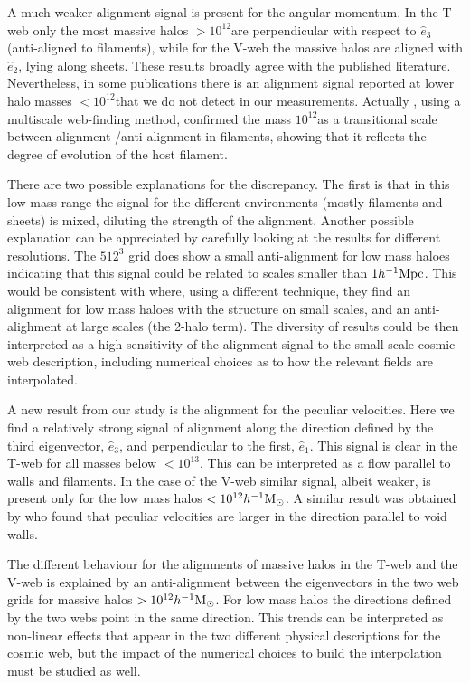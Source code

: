 \documentclass[useAMS,usenatbib]{mn2e}
\newcommand{\hMpc}{{\ifmmode{h^{-1}{\rm Mpc}}\else{$h^{-1}$Mpc }\fi}}
\newcommand{\hMsun}{{\ifmmode{h^{-1}{\rm
        {M_{\odot}}}}\else{$h^{-1}{\rm{M_{\odot}}}$~}\fi}}
\begin{document}
A much weaker alignment signal is present for the angular momentum. In
the T-web only the most massive halos $>10^{12}$\hMsun are
perpendicular with respect to $\hat{e}_3$ (anti-aligned to filaments),
while for the V-web the massive halos are aligned with $\hat{e}_2$,
lying along sheets. These results broadly agree with the
published literature. Nevertheless, in some publications
\citep{AragonCalvo2007,Hahn2007,AragonCalvo2014} there is an alignment signal
reported at lower halo masses $<10^{12}$\hMsun that we do not detect
in our measurements. Actually \cite{AragonCalvo2014}, using a
multiscale web-finding method, confirmed the mass $10^{12}$\hMsun as a
transitional scale between alignment /anti-alignment in filaments,
showing that it reflects the degree of evolution of the host
filament. 


There are two possible explanations for the discrepancy. The first is
that in this low mass range the signal for the different
environments (mostly filaments and sheets) is mixed, diluting the
strength of the alignment. Another possible explanation can be
appreciated by carefully looking at the results for different
resolutions.  The $512^3$ grid does show a small anti-alignment for
low  mass haloes indicating that this signal could be related to scales
smaller than $1\hMpc$.  This would be consistent with
\cite{Paz2008} where, using a different technique, they find an
alignment for low mass haloes with the structure on small scales, and
an anti-alighment at large scales (the 2-halo term). The diversity of
results could be then interpreted as a high sensitivity of the
alignment signal to the small scale cosmic web description, including
numerical choices as to how the relevant fields are interpolated.


A new result from our study is the alignment for the peculiar
velocities. Here we find a relatively strong signal of alignment along
the direction defined by the third eigenvector, $\hat{e}_3$, and
perpendicular to the first, $\hat{e}_1$. This signal is clear in the
T-web for all masses below $<10^{13}$\hMsun. This can be interpreted as
a flow parallel to walls and filaments. In the case of the V-web
similar signal, albeit weaker, is present only for the low mass halos
$<10^{12}\hMsun$. A similar result was obtained by \citep{Padilla2005}
who found that peculiar velocities are larger in the direction
parallel to void walls. 

The different behaviour for the alignments of massive halos in the
T-web and the V-web is explained by an anti-alignment between the
eigenvectors in the two web grids for massive halos
$>10^{12}\hMsun$. For low mass halos the directions defined by the two
webs point in the same direction. This trends can be interpreted as
non-linear effects that appear in the two different physical
descriptions for the cosmic web, but the impact of the numerical
choices to build the interpolation must be studied as well.
\end{document}
